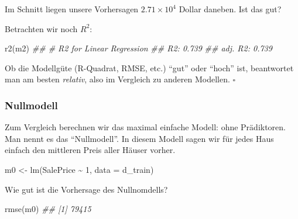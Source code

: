 \documentclass[
  letterpaper,
]{scrbook}
\newenvironment{Shaded}{\begin{snugshade}}{\end{snugshade}}
\newcommand{\AttributeTok}[1]{\textcolor[rgb]{0.40,0.45,0.13}{#1}}
\newcommand{\DecValTok}[1]{\textcolor[rgb]{0.68,0.00,0.00}{#1}}
\newcommand{\DocumentationTok}[1]{\textcolor[rgb]{0.37,0.37,0.37}{\textit{#1}}}
\newcommand{\FunctionTok}[1]{\textcolor[rgb]{0.28,0.35,0.67}{#1}}
\newcommand{\NormalTok}[1]{\textcolor[rgb]{0.00,0.23,0.31}{#1}}
\newcommand{\OtherTok}[1]{\textcolor[rgb]{0.00,0.23,0.31}{#1}}
\newcommand{\SpecialCharTok}[1]{\textcolor[rgb]{0.37,0.37,0.37}{#1}}
\theoremstyle{definition}
\theoremstyle{definition}
\theoremstyle{definition}
\theoremstyle{remark}
\begin{document}
Im Schnitt liegen unsere Vorhersagen \ensuremath{2.71\times 10^{4}}
Dollar daneben. Ist das gut?

Betrachten wir noch \(R^2\):

\begin{Shaded}
\begin{Highlighting}[]
\FunctionTok{r2}\NormalTok{(m2)}
\DocumentationTok{\#\# \# R2 for Linear Regression}
\DocumentationTok{\#\#        R2: 0.739}
\DocumentationTok{\#\#   adj. R2: 0.739}
\end{Highlighting}
\end{Shaded}

\begin{tcolorbox}[enhanced jigsaw, colbacktitle=quarto-callout-note-color!10!white, coltitle=black, bottomrule=.15mm, rightrule=.15mm, arc=.35mm, toptitle=1mm, colframe=quarto-callout-note-color-frame, opacitybacktitle=0.6, left=2mm, leftrule=.75mm, breakable, opacityback=0, bottomtitle=1mm, titlerule=0mm, title=\textcolor{quarto-callout-note-color}{\faInfo}\hspace{0.5em}{Hinweis}, colback=white, toprule=.15mm]

Ob die Modellgüte (R-Quadrat, RMSE, etc.) ``gut'' oder ``hoch'' ist,
beantwortet man am besten \emph{relativ}, also im Vergleich zu anderen
Modellen. \(\square\)

\end{tcolorbox}

\subsubsection{Nullmodell}\label{nullmodell}

Zum Vergleich berechnen wir das maximal einfache Modell: ohne
Prädiktoren. Man nennt es das ``Nullmodell''. In diesem Modell sagen wir
für jedes Haus einfach den mittleren Preis aller Häuser vorher.

\begin{Shaded}
\begin{Highlighting}[]
\NormalTok{m0 }\OtherTok{\textless{}{-}} \FunctionTok{lm}\NormalTok{(SalePrice }\SpecialCharTok{\textasciitilde{}} \DecValTok{1}\NormalTok{, }\AttributeTok{data =}\NormalTok{ d\_train)}
\end{Highlighting}
\end{Shaded}

Wie gut ist die Vorhersage des Nullnomdells?

\begin{Shaded}
\begin{Highlighting}[]
\FunctionTok{rmse}\NormalTok{(m0)}
\DocumentationTok{\#\# [1] 79415}
\end{Highlighting}
\end{Shaded}
\end{document}
